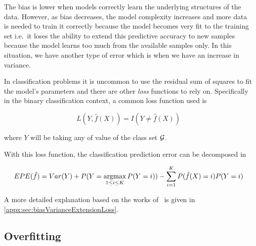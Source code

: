The bias is lower when models correctly learn the underlying structures of the data.
However, as bias decreases, the model complexity increases and more data is needed to train it correctly because the model becomes very fit to the training set i.e.\ it loses the ability to extend this predictive accuracy to new samples because the model learns too much from the available samples only.
In this situation, we have another type of error which is when we have an increase in variance.



In classification problems it is uncommon to use the residual sum of squares to fit the model's parameters and there are other \textit{loss} functions to rely on.
Specifically in the binary classification context, a common loss function used is

\begin{equation}
L(Y, \hat{f}(X)) = I(Y \neq \hat{f}(X))
\end{equation}\label{eq:classificationLossFunction}

where $Y$ will be taking any of value of the class set $\operatorname{\mathcal{G}}$.

With this loss function, the classification prediction error can be decomposed in

\begin{equation}
EPE( \hat{f} ) = Var(Y) + P(Y=\operatorname*{argmax}_{1\leq i \leq K} P(Y=i)) - \sum_{i=1}^K P(\hat{f}(X) =i)P(Y=i)
\end{equation}

A more detailed explanation based on the works of~\citep{james-biasVarianceGeneral} is given in \cref{appx:sec:biasVarianceExtensionLoss}.

\subsection{Overfitting}\label{subsection-overfitting}

